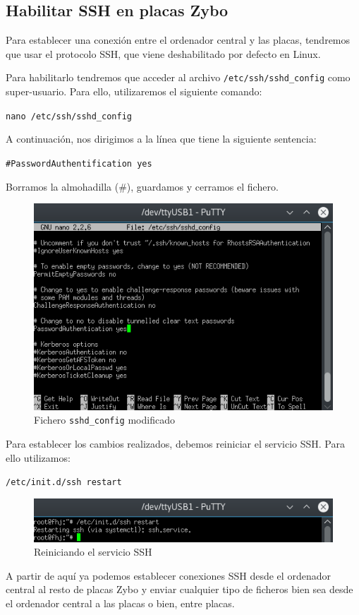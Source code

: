\subsection{Habilitar SSH en placas Zybo}
Para establecer una conexión entre el ordenador central y las placas, tendremos que usar el protocolo SSH, que viene deshabilitado por defecto en Linux.

Para habilitarlo tendremos que acceder al archivo \texttt{/etc/ssh/sshd\_config} como super-usuario. Para ello, utilizaremos el siguiente comando:
\begin{center}
	\texttt{nano /etc/ssh/sshd\_config}
\end{center}
A continuación, nos dirigimos a la línea que tiene la siguiente sentencia:
\begin{center}
	\texttt{\#PasswordAuthentification yes}
\end{center}
Borramos la almohadilla (\#), guardamos y cerramos el fichero.
\begin{figure}[h]
	\centering
	\includegraphics[scale=0.8]{Anexos/Anexo2/Linux/SSH.png}
	\caption{Fichero \texttt{sshd\_config} modificado}
	\label{Fichero ssh_d modificado}
\end{figure}

\newpage
Para establecer los cambios realizados, debemos reiniciar el servicio SSH. Para ello utilizamos:
\begin{center}
	\texttt{/etc/init.d/ssh restart}
\end{center}
\begin{figure}[h]
	\centering
	\includegraphics[scale=0.8]{Anexos/Anexo2/Linux/SSHRestart.png}
	\caption{Reiniciando el servicio SSH}
	\label{Reiniciando el servicio SSH}
\end{figure}

A partir de aquí ya podemos establecer conexiones SSH desde el ordenador central al resto de placas Zybo y enviar cualquier tipo de ficheros bien sea desde el ordenador central a las placas o bien, entre placas.